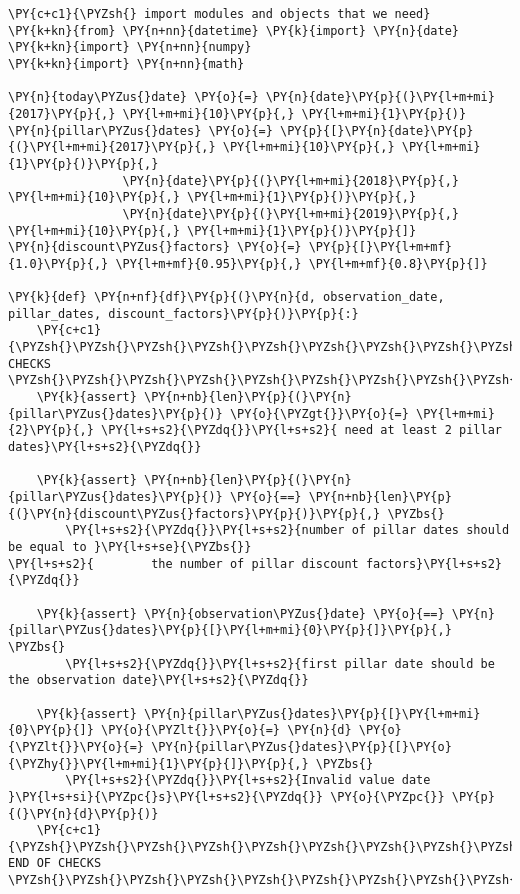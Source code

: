 \begin{Answer}
\begin{tcolorbox}[size=fbox, boxrule=1pt, colback=cellbackground, colframe=cellborder]
\begin{Verbatim}[commandchars=\\\{\}]
\PY{c+c1}{\PYZsh{} import modules and objects that we need}
\PY{k+kn}{from} \PY{n+nn}{datetime} \PY{k}{import} \PY{n}{date}
\PY{k+kn}{import} \PY{n+nn}{numpy}
\PY{k+kn}{import} \PY{n+nn}{math}

\PY{n}{today\PYZus{}date} \PY{o}{=} \PY{n}{date}\PY{p}{(}\PY{l+m+mi}{2017}\PY{p}{,} \PY{l+m+mi}{10}\PY{p}{,} \PY{l+m+mi}{1}\PY{p}{)}
\PY{n}{pillar\PYZus{}dates} \PY{o}{=} \PY{p}{[}\PY{n}{date}\PY{p}{(}\PY{l+m+mi}{2017}\PY{p}{,} \PY{l+m+mi}{10}\PY{p}{,} \PY{l+m+mi}{1}\PY{p}{)}\PY{p}{,} 
                \PY{n}{date}\PY{p}{(}\PY{l+m+mi}{2018}\PY{p}{,} \PY{l+m+mi}{10}\PY{p}{,} \PY{l+m+mi}{1}\PY{p}{)}\PY{p}{,} 
                \PY{n}{date}\PY{p}{(}\PY{l+m+mi}{2019}\PY{p}{,} \PY{l+m+mi}{10}\PY{p}{,} \PY{l+m+mi}{1}\PY{p}{)}\PY{p}{]}
\PY{n}{discount\PYZus{}factors} \PY{o}{=} \PY{p}{[}\PY{l+m+mf}{1.0}\PY{p}{,} \PY{l+m+mf}{0.95}\PY{p}{,} \PY{l+m+mf}{0.8}\PY{p}{]}

\PY{k}{def} \PY{n+nf}{df}\PY{p}{(}\PY{n}{d, observation_date, pillar_dates, discount_factors}\PY{p}{)}\PY{p}{:}
    \PY{c+c1}{\PYZsh{}\PYZsh{}\PYZsh{}\PYZsh{}\PYZsh{}\PYZsh{}\PYZsh{}\PYZsh{}\PYZsh{}\PYZsh{}\PYZsh{}\PYZsh{}\PYZsh{}\PYZsh{} CHECKS \PYZsh{}\PYZsh{}\PYZsh{}\PYZsh{}\PYZsh{}\PYZsh{}\PYZsh{}\PYZsh{}\PYZsh{}\PYZsh{}\PYZsh{}\PYZsh{}\PYZsh{}\PYZsh{}\PYZsh{}\PYZsh{}}
    \PY{k}{assert} \PY{n+nb}{len}\PY{p}{(}\PY{n}{pillar\PYZus{}dates}\PY{p}{)} \PY{o}{\PYZgt{}}\PY{o}{=} \PY{l+m+mi}{2}\PY{p}{,} \PY{l+s+s2}{\PYZdq{}}\PY{l+s+s2}{ need at least 2 pillar dates}\PY{l+s+s2}{\PYZdq{}}
    
    \PY{k}{assert} \PY{n+nb}{len}\PY{p}{(}\PY{n}{pillar\PYZus{}dates}\PY{p}{)} \PY{o}{==} \PY{n+nb}{len}\PY{p}{(}\PY{n}{discount\PYZus{}factors}\PY{p}{)}\PY{p}{,} \PYZbs{}
        \PY{l+s+s2}{\PYZdq{}}\PY{l+s+s2}{number of pillar dates should be equal to }\PY{l+s+se}{\PYZbs{}}
\PY{l+s+s2}{        the number of pillar discount factors}\PY{l+s+s2}{\PYZdq{}}
    
    \PY{k}{assert} \PY{n}{observation\PYZus{}date} \PY{o}{==} \PY{n}{pillar\PYZus{}dates}\PY{p}{[}\PY{l+m+mi}{0}\PY{p}{]}\PY{p}{,} \PYZbs{}
        \PY{l+s+s2}{\PYZdq{}}\PY{l+s+s2}{first pillar date should be the observation date}\PY{l+s+s2}{\PYZdq{}}
    
    \PY{k}{assert} \PY{n}{pillar\PYZus{}dates}\PY{p}{[}\PY{l+m+mi}{0}\PY{p}{]} \PY{o}{\PYZlt{}}\PY{o}{=} \PY{n}{d} \PY{o}{\PYZlt{}}\PY{o}{=} \PY{n}{pillar\PYZus{}dates}\PY{p}{[}\PY{o}{\PYZhy{}}\PY{l+m+mi}{1}\PY{p}{]}\PY{p}{,} \PYZbs{}
        \PY{l+s+s2}{\PYZdq{}}\PY{l+s+s2}{Invalid value date }\PY{l+s+si}{\PYZpc{}s}\PY{l+s+s2}{\PYZdq{}} \PY{o}{\PYZpc{}} \PY{p}{(}\PY{n}{d}\PY{p}{)}
    \PY{c+c1}{\PYZsh{}\PYZsh{}\PYZsh{}\PYZsh{}\PYZsh{}\PYZsh{}\PYZsh{}\PYZsh{}\PYZsh{}\PYZsh{}\PYZsh{}\PYZsh{}\PYZsh{}\PYZsh{} END OF CHECKS \PYZsh{}\PYZsh{}\PYZsh{}\PYZsh{}\PYZsh{}\PYZsh{}\PYZsh{}\PYZsh{}\PYZsh{}\PYZsh{}\PYZsh{}\PYZsh{}\PYZsh{}\PYZsh{}\PYZsh{}\PYZsh{}}
    

\end{Verbatim}
\end{tcolorbox}
\end{Answer}
